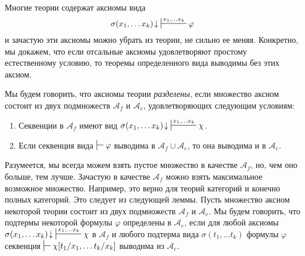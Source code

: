 \documentclass[reqno]{amsart}
\theoremstyle{definition}
\theoremstyle{remark}
\begin{document}
Многие теории содержат аксиомы вида
\[ \sigma(x_1, \ldots x_k)\!\downarrow\ \sststile{}{x_1, \ldots x_k} \varphi \]
и зачастую эти аксиомы можно убрать из теории, не сильно ее меняя.
Конкретно, мы докажем, что если отсальные аксиомы удовлетворяют простому естественному условию, то теоремы определенного вида выводимы без этих аксиом.

Мы будем говорить, что аксиомы теории \emph{разделены}, если множество аксиом состоит из двух подмножеств $\mathcal{A}_f$ и $\mathcal{A}_e$, удовлетворяющих следующим условиям:
\begin{enumerate}
\item \label{it:sep-f} Секвенции в $\mathcal{A}_f$ имеют вид $\sigma(x_1, \ldots x_k)\!\downarrow\ \sststile{}{x_1, \ldots x_k} \chi$.
\item \label{it:sep-e} Если секвенция вида $\sststile{}{} \varphi$ выводима в $\mathcal{A}_f \cup \mathcal{A}_e$, то она выводима и в $\mathcal{A}_e$.
\end{enumerate}

Разумеется, мы всегда можем взять пустое множество в качестве $\mathcal{A}_f$, но, чем оно больше, тем лучше.
Зачастую в качестве $\mathcal{A}_f$ можно взять максимальное возможное множество.
Например, это верно для теорий категорий и конечно полных категорий.
Это следует из следующей леммы.
Пусть множество аксиом некоторой теории состоит из двух подмножеств $\mathcal{A}_f$ и $\mathcal{A}_e$.
Мы будем говорить, что подтермы некоторой формулы $\varphi$ определены в $\mathcal{A}_e$, если для любой аксиомы $\sigma(x_1, \ldots x_k)\!\downarrow\ \sststile{}{x_1, \ldots x_k} \chi$ в $\mathcal{A}_f$
и любого подтерма вида $\sigma(t_1, \ldots t_k)$ формулы $\varphi$ секвенция $\sststile{}{} \chi[t_1/x_1, \ldots t_k/x_k]$ выводима из $\mathcal{A}_e$.
\end{document}

